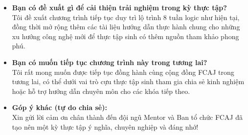 \begin{itemize}
\item
  \textbf{Bạn có đề xuất gì để cải thiện trải nghiệm trong kỳ thực
  tập?}\\
  Tôi đề xuất chương trình tiếp tục duy trì lộ trình 8 tuần logic như
  hiện tại, đồng thời mở rộng thêm các tài liệu hướng dẫn thực hành
  chung cho những xu hướng công nghệ mới để thực tập sinh có thêm nguồn
  tham khảo phong phú.
\item
  \textbf{Bạn có muốn tiếp tục chương trình này trong tương lai?}\\
  Tôi rất mong muốn được tiếp tục đồng hành cùng cộng đồng FCAJ trong
  tương lai, có thể dưới vai trò cựu thực tập sinh tham gia chia sẻ kinh
  nghiệm hoặc hỗ trợ hướng dẫn chuyên môn cho các khóa tiếp theo.
\item
  \textbf{Góp ý khác (tự do chia sẻ):}\\
  Xin gửi lời cảm ơn chân thành đến đội ngũ Mentor và Ban tổ chức FCAJ
  đã tạo nên một kỳ thực tập ý nghĩa, chuyên nghiệp và đáng nhớ!
\end{itemize}
